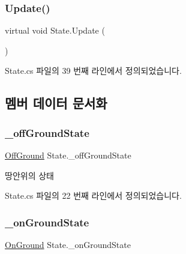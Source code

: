 \subsubsection{\texorpdfstring{Update()}{Update()}}
{\footnotesize\ttfamily virtual void State.\+Update (\begin{DoxyParamCaption}{ }\end{DoxyParamCaption})\hspace{0.3cm}{\ttfamily [virtual]}}



State.\+cs 파일의 39 번째 라인에서 정의되었습니다.


\begin{DoxyCode}{0}

\end{DoxyCode}


\subsection{멤버 데이터 문서화}
\mbox{\label{class_state_ad421039bfc35b46969f174c9617ab786}} 
\subsubsection{\texorpdfstring{\_offGroundState}{\_offGroundState}}
{\footnotesize\ttfamily \mbox{\hyperlink{class_state_a7d945e793324c017a973205564cf1a56}{Off\+Ground}} State.\+\_\+off\+Ground\+State}



땅안위의 상태 



State.\+cs 파일의 22 번째 라인에서 정의되었습니다.

\mbox{\label{class_state_ab3170df5e58f541f39edff3c1278d443}} 
\subsubsection{\texorpdfstring{\_onGroundState}{\_onGroundState}}
{\footnotesize\ttfamily \mbox{\hyperlink{class_state_ab9eb1c1d81f1903b8486d1275e78b68e}{On\+Ground}} State.\+\_\+on\+Ground\+State}



